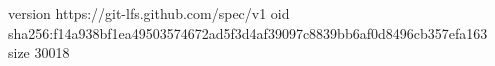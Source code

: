 version https://git-lfs.github.com/spec/v1
oid sha256:f14a938bf1ea49503574672ad5f3d4af39097c8839bb6af0d8496cb357efa163
size 30018
